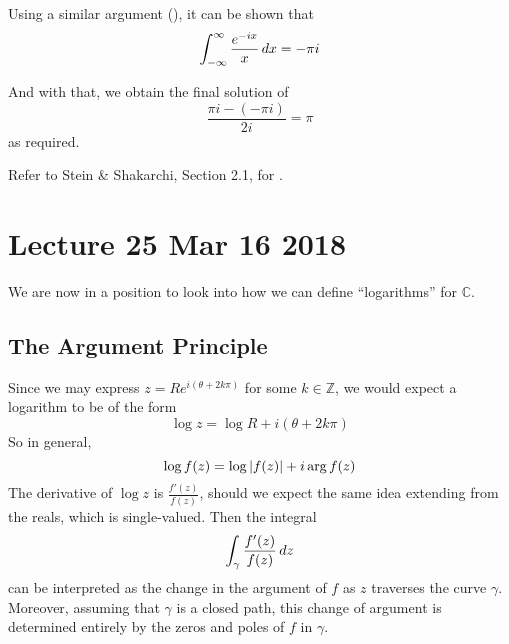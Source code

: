 \documentclass[11pt, oneside]{book}
\begin{document}
\begin{ex}
  Using a similar argument (), it can be shown that
  \begin{equation*}
    \int_{-\infty}^{\infty} \frac{e^{-ix}}{x} \mathop{}\!d{x} = - \pi i
  \end{equation*}

  And with that, we obtain the final solution of
  \begin{equation*}
    \frac{\pi i - (- \pi i)}{2i} = \pi
  \end{equation*}
  as required.
\end{ex}

Refer to Stein \& Shakarchi, Section 2.1, for .



\chapter{Lecture 25 Mar 16 2018}
  \label{chapter:lecture_25_mar_16_2018}

We are now in a position to look into how we can define ``logarithms'' for $\mathbb{C}$.

\section{The Argument Principle} %
\label{sec:the_argument_principle}

Since we may express $z = Re^{i (\theta + 2k \pi)}$ for some $k \in \mathbb{Z}$, we would expect a logarithm to be of the form
\begin{equation*}
  \log z = \log R + i (\theta + 2k \pi)
\end{equation*}
So in general,
\begin{equation*}
  \log f(z) = \log \left|f(z)\right| + i \arg{f(z)}
\end{equation*}
The derivative of $\log z$ is $\frac{f'(z)}{f(z)}$, should we expect the same idea extending from the reals, which is single-valued. Then the integral
\begin{equation*}
  \int_{\gamma} \frac{f'(z)}{f(z)} \mathop{}\!d{z} 
\end{equation*}
can be interpreted as the change in the argument of $f$ as $z$ traverses the curve $\gamma$. Moreover, assuming that $\gamma$ is a closed path, this change of argument is determined entirely by the zeros and poles of $f$ in $\gamma$. 
\end{document}

